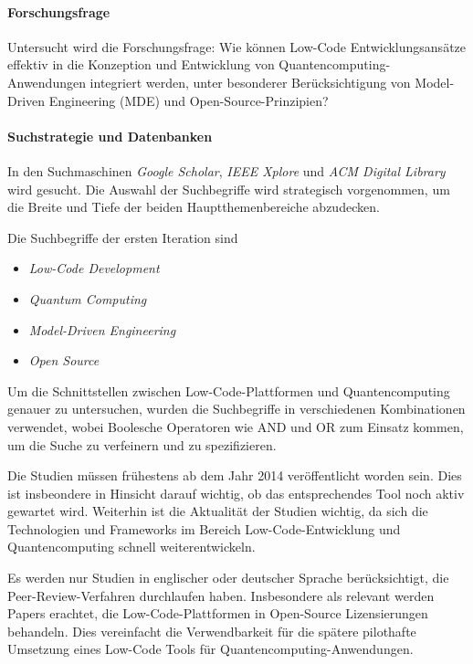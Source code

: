 \paragraph{Forschungsfrage}
Untersucht wird die Forschungsfrage: Wie können Low-Code Entwicklungsansätze 
effektiv in die Konzeption und Entwicklung von Quantencomputing-Anwendungen 
integriert werden, unter besonderer Berücksichtigung von Model-Driven 
Engineering (MDE) und Open-Source-Prinzipien?

\paragraph{Suchstrategie und Datenbanken}
In den Suchmaschinen \textit{Google Scholar}, \textit{IEEE Xplore} und \textit{ACM Digital Library} 
wird gesucht. Die Auswahl der Suchbegriffe wird strategisch vorgenommen, um die Breite und Tiefe der beiden 
Hauptthemenbereiche abzudecken. 

Die Suchbegriffe der ersten Iteration sind
\begin{itemize}
    \item \textit{Low-Code Development} 
    \item \textit{Quantum Computing}
    \item \textit{Model-Driven Engineering}
    \item \textit{Open Source}
\end{itemize} 

Um die Schnittstellen zwischen Low-Code-Plattformen und Quantencomputing genauer zu untersuchen, 
wurden die Suchbegriffe in verschiedenen Kombinationen verwendet, wobei Boolesche Operatoren wie 
AND und OR zum Einsatz kommen, um die Suche zu verfeinern und zu spezifizieren.

Die Studien müssen frühestens ab dem Jahr 2014 veröffentlicht worden sein. Dies ist insbeondere in 
Hinsicht darauf wichtig, ob das entsprechendes Tool noch aktiv gewartet wird. 
Weiterhin ist die Aktualität der Studien wichtig, da sich die Technologien und Frameworks 
im Bereich Low-Code-Entwicklung und Quantencomputing schnell weiterentwickeln.

Es werden nur Studien in englischer oder deutscher Sprache berücksichtigt, die Peer-Review-Verfahren 
durchlaufen haben. Insbesondere als relevant werden Papers erachtet, die Low-Code-Plattformen 
in Open-Source Lizensierungen behandeln. Dies vereinfacht die Verwendbarkeit für 
die spätere pilothafte Umsetzung eines Low-Code Tools für Quantencomputing-Anwendungen.

